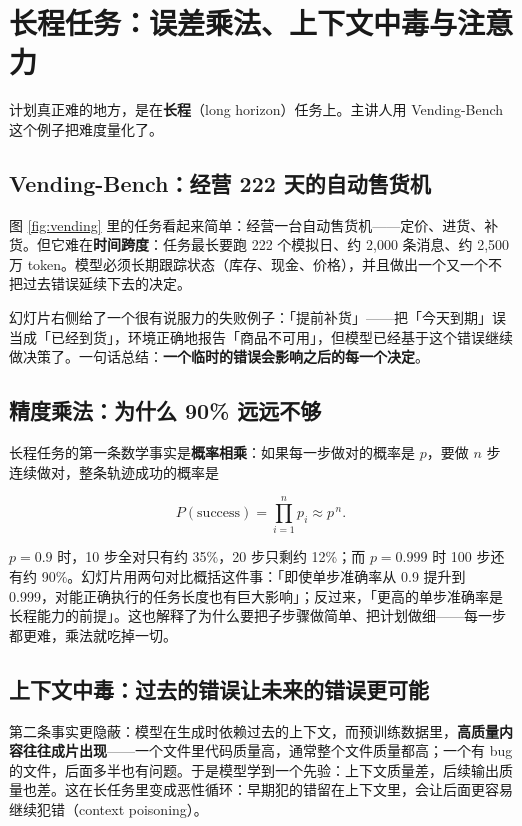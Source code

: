 \documentclass[a4paper]{article}
\begin{document}
\section{长程任务：误差乘法、上下文中毒与注意力}

计划真正难的地方，是在\textbf{长程}（long horizon）任务上。主讲人用 Vending-Bench 这个例子把难度量化了。

\subsection{Vending-Bench：经营 222 天的自动售货机}

图 \ref{fig:vending} 里的任务看起来简单：经营一台自动售货机——定价、进货、补货。但它难在\textbf{时间跨度}：任务最长要跑 222 个模拟日、约 2,000 条消息、约 2,500 万 token。模型必须长期跟踪状态（库存、现金、价格），并且做出一个又一个不把过去错误延续下去的决定。

幻灯片右侧给了一个很有说服力的失败例子：「提前补货」——把「今天到期」误当成「已经到货」，环境正确地报告「商品不可用」，但模型已经基于这个错误继续做决策了。一句话总结：\textbf{一个临时的错误会影响之后的每一个决定}。

\subsection{精度乘法：为什么 90\% 远远不够}

长程任务的第一条数学事实是\textbf{概率相乘}：如果每一步做对的概率是 $p$，要做 $n$ 步连续做对，整条轨迹成功的概率是

$$
P(\text{success}) = \prod_{i=1}^{n} p_i \approx p^{\,n}.
$$

$p=0.9$ 时，10 步全对只有约 35\%，20 步只剩约 12\%；而 $p=0.999$ 时 100 步还有约 90\%。幻灯片用两句对比概括这件事：「即使单步准确率从 0.9 提升到 0.999，对能正确执行的任务长度也有巨大影响」；反过来，「更高的单步准确率是长程能力的前提」。这也解释了为什么要把子步骤做简单、把计划做细——每一步都更难，乘法就吃掉一切。

\subsection{上下文中毒：过去的错误让未来的错误更可能}

第二条事实更隐蔽：模型在生成时依赖过去的上下文，而预训练数据里，\textbf{高质量内容往往成片出现}——一个文件里代码质量高，通常整个文件质量都高；一个有 bug 的文件，后面多半也有问题。于是模型学到一个先验：上下文质量差，后续输出质量也差。这在长任务里变成恶性循环：早期犯的错留在上下文里，会让后面更容易继续犯错（context poisoning）。
\end{document}

